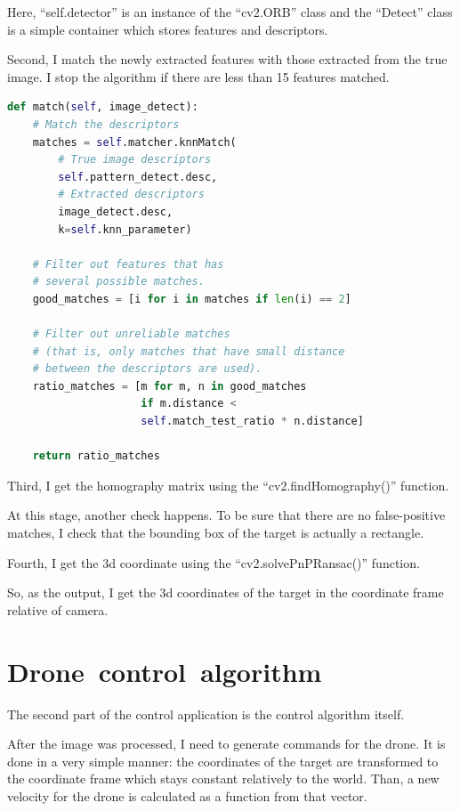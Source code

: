 \documentclass[12pt]{article}
\begin{document}
    Here, ``self.detector'' is an instance of the ``cv2.ORB'' class and the 
    ``Detect'' class is a simple container which stores features
    and descriptors.

    Second, I match the newly extracted features with those extracted from the
    true image.
    I stop the algorithm if there are less than 15 features matched.

    \begin{lstlisting}[frame=single,language=Python]
def match(self, image_detect):
    # Match the descriptors
    matches = self.matcher.knnMatch(
        # True image descriptors
        self.pattern_detect.desc,
        # Extracted descriptors
        image_detect.desc,
        k=self.knn_parameter)

    # Filter out features that has
    # several possible matches.
    good_matches = [i for i in matches if len(i) == 2]

    # Filter out unreliable matches
    # (that is, only matches that have small distance
    # between the descriptors are used).
    ratio_matches = [m for m, n in good_matches
                     if m.distance <
                     self.match_test_ratio * n.distance]
    
    return ratio_matches
    \end{lstlisting}

    Third, I get the homography matrix using the ``cv2.findHomography()'' function.

    At this stage, another check happens. To be sure that there are no
    false-positive matches, I check that the bounding box of the target
    is actually a rectangle.

    Fourth, I get the 3d coordinate using the ``cv2.solvePnPRansac()'' function.

    So, as the output, I get the 3d coordinates of the target
    in the coordinate frame relative of camera.

    \section{Drone~control~algorithm}
    \label{sec:drone_control_algorithm}

    The second part of the control application is the control algorithm
    itself.

    After the image was processed, I need to generate commands for the drone.
    It is done in a very simple manner: the coordinates of the target are
    transformed to the coordinate frame which stays constant relatively
    to the world. Than, a new velocity for the drone is calculated
    as a function from that vector.
\end{document}
